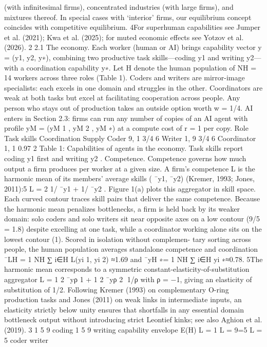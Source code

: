 (with infinitesimal firms), concentrated industries (with large firms), and mixtures thereof. In special
cases with ‘interior’ firms, our equilibrium concept coincides with competitive equilibrium.
4For superhuman capabilities see Jumper et al. (2021); Kwa et al. (2025); for muted economic effects
see Yotzov et al. (2026).
2
2.1 The
economy.
Each
worker
(human
or
AI)
brings
capability
vector
y = (y1, y2, y∗), combining two productive task skills—coding y1 and writing
y2—with a coordination capability y∗.
Let H denote the human population of
NH = 14 workers across three roles (Table 1). Coders and writers are mirror-image
specialists: each excels in one domain and struggles in the other. Coordinators are
weak at both tasks but excel at facilitating cooperation across people. Any person
who stays out of production takes an outside option worth w = 1/4. AI enters
in Section 2.3: firms can run any number of copies of an AI agent with profile
yM = (yM
1 , yM
2 , yM
∗) at a compute cost of r = 1 per copy.
Role
Task skills
Coordination
Supply
Coder
9, 1
3/4
6
Writer
1, 9
3/4
6
Coordinator
1, 1
0.97
2
Table 1: Capabilities of agents in the economy. Task skills report coding y1 first and
writing y2 .
Competence. Competence governs how much output a firm produces per worker at a
given size. A firm’s competence L is the harmonic mean of its members’ average skills
( ¯y1, ¯y2) (Kremer, 1993; Jones, 2011):5
L =
2
1/ ¯y1 + 1/ ¯y2
.
Figure 1(a) plots this aggregator in skill space. Each curved contour traces skill pairs
that deliver the same competence. Because the harmonic mean penalizes bottlenecks,
a firm is held back by its weaker domain: solo coders and solo writers sit near opposite
axes on a low contour (9/5 = 1.8) despite excelling at one task, while a coordinator
working alone sits on the lowest contour (1). Scored in isolation without complemen-
tary sorting across people, the human population averages standalone competence
and coordination
¯LH =
1
NH ∑
i∈H
L(yi
1, yi
2) ≈1.69
and
¯yH
∗=
1
NH ∑
i∈H
yi
∗≈0.78.
5The harmonic mean corresponds to a symmetric constant-elasticity-of-substitution aggregator
L =
  1
2 ¯yρ
1 + 1
2 ¯yρ
2
1/ρ with ρ = −1, giving an elasticity of substitution of 1/2. Following Kremer (1993)
on complementary O-ring production tasks and Jones (2011) on weak links in intermediate inputs, an
elasticity strictly below unity ensures that shortfalls in any essential domain bottleneck output without
introducing strict Leontief kinks; see also Aghion et al. (2019).
3
1
5
9
coding
1
5
9
writing
capability
envelope E(H)
L = 1
L = 9=5
L = 5
coder
writer
